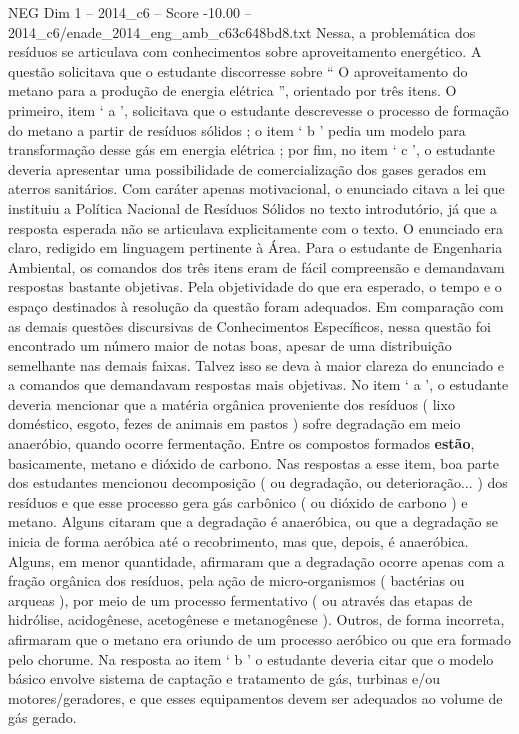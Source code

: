 \begin{textsample}{NEG Dim 1 – 2014\_c6 – Score -10.00 – 2014\_c6/enade\_2014\_eng\_amb\_c63c648bd8.txt}
Nessa, a problemática dos resíduos se articulava com conhecimentos sobre aproveitamento energético.
A questão solicitava que o estudante discorresse sobre “ O aproveitamento do metano para a produção de energia elétrica ”, orientado por três itens.
O primeiro, item ‘ a ’, solicitava que o estudante descrevesse o processo de formação do metano a partir de resíduos sólidos ; o item ‘ b ’ pedia um modelo para transformação desse gás em energia elétrica ; por fim, no item ‘ c ’, o estudante deveria apresentar uma possibilidade de comercialização dos gases gerados em aterros sanitários.
Com caráter apenas motivacional, o enunciado citava a lei que instituiu a Política Nacional de Resíduos Sólidos no texto introdutório, já que a resposta esperada não se articulava explicitamente com o texto.
O enunciado era claro, redigido em linguagem pertinente à Área.
Para o estudante de Engenharia Ambiental, os comandos dos três itens eram de fácil compreensão e demandavam respostas bastante objetivas.
Pela objetividade do que era esperado, o tempo e o espaço destinados à resolução da questão foram adequados.
Em comparação com as demais questões discursivas de Conhecimentos Específicos, nessa questão foi encontrado um número maior de notas boas, apesar de uma distribuição semelhante nas demais faixas.
Talvez isso se deva à maior clareza do enunciado e a comandos que demandavam respostas mais objetivas.
No item ‘ a ’, o estudante deveria mencionar que a matéria orgânica proveniente dos resíduos ( lixo doméstico, esgoto, fezes de animais em pastos ) sofre degradação em meio anaeróbio, quando ocorre fermentação.
Entre os compostos formados \textbf{estão}, basicamente, metano e dióxido de carbono.
Nas respostas a esse item, boa parte dos estudantes mencionou decomposição ( ou degradação, ou deterioração... ) dos resíduos e que esse processo gera gás carbônico ( ou dióxido de carbono ) e metano.
Alguns citaram que a degradação é anaeróbica, ou que a degradação se inicia de forma aeróbica até o recobrimento, mas que, depois, é anaeróbica.
Alguns, em menor quantidade, afirmaram que a degradação ocorre apenas com a fração orgânica dos resíduos, pela ação de micro-organismos ( bactérias ou arqueas ), por meio de um processo fermentativo ( ou através das etapas de hidrólise, acidogênese, acetogênese e metanogênese ).
Outros, de forma incorreta, afirmaram que o metano era oriundo de um processo aeróbico ou que era formado pelo chorume.
Na resposta ao item ‘ b ’ o estudante deveria citar que o modelo básico envolve sistema de captação e tratamento de gás, turbinas e/ou motores/geradores, e que esses equipamentos devem ser adequados ao volume de gás gerado.

\end{textsample}
